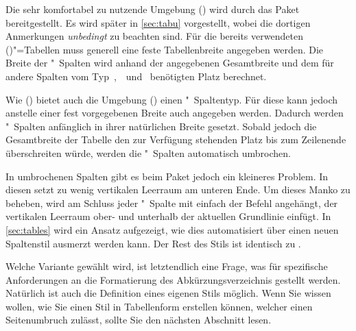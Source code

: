 \documentclass[%
  english,ngerman,%
  cdgeometry=no,DIV=12,automark%
]{tudscrartcl}
\begin{document}
Die sehr komfortabel zu nutzende Umgebung () 
wird durch das Paket  bereitgestellt. Es wird später in 
\autoref{sec:tabu} vorgestellt, wobei die dortigen Anmerkungen \emph{unbedingt} 
zu beachten sind. Für die bereits verwendeten 
()"=Tabellen muss generell eine feste 
Tabellenbreite angegeben werden. Die Breite der "~Spalten wird anhand 
der angegebenen Gesamtbreite und dem für andere Spalten vom 
Typ~,~~und~ benötigten Platz berechnet. 

Wie () bietet auch die Umgebung 
() einen "~Spaltentyp. Für diese kann 
jedoch anstelle einer fest vorgegebenen Breite auch  
angegeben werden. Dadurch werden "~Spalten anfänglich in ihrer 
natürlichen Breite gesetzt. Sobald jedoch die Gesamtbreite der Tabelle den zur 
Verfügung stehenden Platz bis zum Zeilenende überschreiten würde, werden die 
"~Spalten automatisch umbrochen. 

In umbrochenen Spalten gibt es beim Paket  jedoch ein kleineres 
Problem. In diesen setzt  zu wenig vertikalen Leerraum am unteren 
Ende. Um dieses Manko zu beheben, wird am Schluss jeder "~Spalte mit 
 einfach der Befehl  
angehängt, der vertikalen Leerraum ober- und unterhalb der aktuellen Grundlinie 
einfügt. In \autoref{sec:tables} wird ein Ansatz aufgezeigt, wie dies 
automatisiert über einen neuen Spaltenstil ausmerzt werden kann. Der Rest des 
Stils ist identisch zu .
%
\CodeHook{\let\newglossarystyle\renewglossarystyle}
\begin{Preamble*}

\end{Preamble*}
\begin{Hint}
\printacronyms[style=acrotabu]
\end{Hint}
\begin{quoting}[rightmargin=0pt]
\glsdisablehyper
\InputCode
\end{quoting}
%
Welche Variante gewählt wird, ist letztendlich eine Frage, was für spezifische 
Anforderungen an die Formatierung des Abkürzungsverzeichnis gestellt werden. 
Natürlich ist auch die Definition eines eigenen Stils möglich. Wenn Sie wissen 
wollen, wie Sie einen Stil in Tabellenform erstellen können, welcher einen 
Seitenumbruch zulässt, sollte Sie den nächsten Abschnitt lesen.
\end{document}

